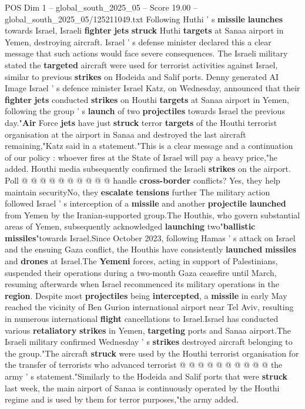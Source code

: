 \begin{textsample}{POS Dim 1 – global\_south\_2025\_05 – Score 19.00 – global\_south\_2025\_05/125211049.txt}  \label{ex:f1_pos_284}
Following Huthi ' s \textbf{missile} \textbf{launches} towards Israel, Israeli \textbf{fighter} \textbf{jets} \textbf{struck} Huthi \textbf{targets} at Sanaa airport in Yemen, destroying aircraft.
Israel ' s defense minister declared this a clear message that such actions would face severe consequences.
The Israeli military stated the \textbf{targeted} aircraft were used for terrorist activities against Israel, similar to previous \textbf{strikes} on Hodeida and Salif ports.
Denny generated AI Image Israel ' s defence minister Israel Katz, on Wednesday, announced that their \textbf{fighter} \textbf{jets} conducted \textbf{strikes} on Houthi \textbf{targets} at Sanaa airport in Yemen, following the group ' s \textbf{launch} of two \textbf{projectiles} towards Israel the previous day."\textbf{Air} Force \textbf{jets} have just \textbf{struck} terror \textbf{targets} of the Houthi terrorist organisation at the airport in Sanaa and destroyed the last aircraft remaining,"Katz said in a statement."This is a clear message and a continuation of our policy : whoever fires at the State of Israel will pay a heavy price,"he added.
Houthi media subsequently confirmed the Israeli \textbf{strikes} on the airport.
Poll @ @ @ @ @ @ @ @ @ @ handle \textbf{cross-border} conflicts?
Yes, they help maintain securityNo, they \textbf{escalate} \textbf{tensions} further The military action followed Israel ' s interception of a \textbf{missile} and another \textbf{projectile} \textbf{launched} from Yemen by the Iranian-supported group.The Houthis, who govern substantial areas of Yemen, subsequently acknowledged \textbf{launching} two"\textbf{ballistic} \textbf{missiles}"towards Israel.Since October 2023, following Hamas ' s attack on Israel and the ensuing Gaza conflict, the Houthis have consistently \textbf{launched} \textbf{missiles} and \textbf{drones} at Israel.The \textbf{Yemeni} forces, acting in support of Palestinians, suspended their operations during a two-month Gaza ceasefire until March, resuming afterwards when Israel recommenced its military operations in the \textbf{region}.
Despite most \textbf{projectiles} being \textbf{intercepted}, a \textbf{missile} in early May reached the vicinity of Ben Gurion international airport near Tel Aviv, resulting in numerous international \textbf{flight} cancellations to Israel.Israel has conducted various \textbf{retaliatory} \textbf{strikes} in Yemen, \textbf{targeting} ports and Sanaa airport.The Israeli military confirmed Wednesday ' s \textbf{strikes} destroyed aircraft belonging to the group."The aircraft \textbf{struck} were used by the Houthi terrorist organisation for the transfer of terrorists who advanced terrorist @ @ @ @ @ @ @ @ @ @ the army ' s statement."Similarly to the Hodeida and Salif ports that were \textbf{struck} last week, the main airport of Sanaa is continuously operated by the Houthi regime and is used by them for terror purposes,"the army added.

\end{textsample}
